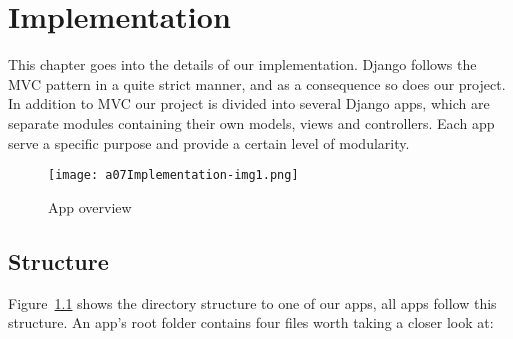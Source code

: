 \chapter{Implementation}\label{chapter:implementation}
This chapter goes into the details of our implementation. 
Django follows the MVC pattern in a quite strict
manner, and as a consequence so does our project. In addition to MVC
our project is divided into several Django apps, which are separate
modules containing their own models, views and controllers. 
Each app serve a specific purpose and provide a certain level of
modularity. 

\begin{figure}
	\texttt{[image: a07Implementation-img1.png]}
	\caption{App overview}
	\label{fig:appOverview}
\end{figure}

\section{Structure}
Figure~\ref{fig:appOverview} shows the directory structure to one of our apps,
all apps follow this structure. An app's root folder contains four files worth
taking a closer look at:

